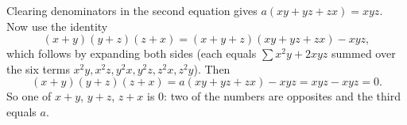 Clearing denominators in the second equation gives $a(xy+yz+zx)=xyz$. Now use the identity
\[(x+y)(y+z)(z+x)=(x+y+z)(xy+yz+zx)-xyz,\]
which follows by expanding both sides (each equals $\sum x^2y+2xyz$ summed over the six terms $x^2y,x^2z,y^2x,y^2z,z^2x,z^2y$). Then
\[(x+y)(y+z)(z+x)=a(xy+yz+zx)-xyz=xyz-xyz=\boxed{0}.\]
So one of $x+y$, $y+z$, $z+x$ is $0$: two of the numbers are opposites and the third equals $a$.
